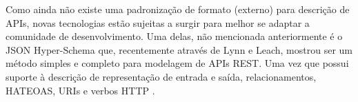 Como ainda não existe uma padronização de formato (externo) para descrição de APIs, novas tecnologias estão sujeitas a surgir para melhor se adaptar a comunidade de desenvolvimento. Uma delas, não mencionada anteriormente é o JSON Hyper-Schema que, recentemente através de Lynn e Leach, mostrou ser um método simples e completo para modelagem de APIs REST. Uma vez que possui suporte à descrição de representação de entrada e saída, relacionamentos, HATEOAS, URIs e verbos HTTP  \cite{LynnEtAl2016} \cite{Leach2014}.
